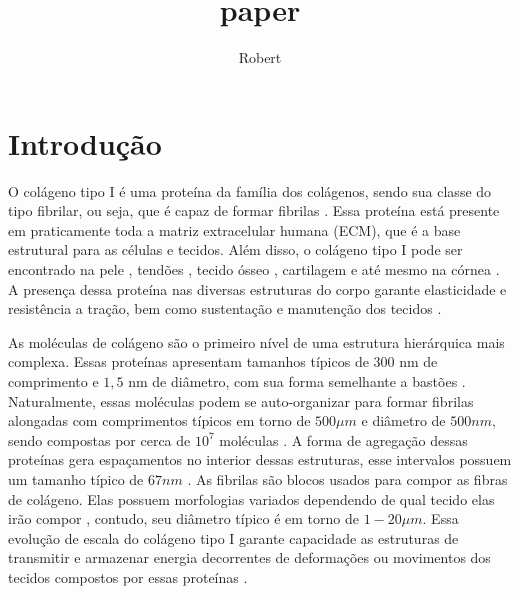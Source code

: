 \documentclass[11pt,a4paper]{article} %
\title{paper}
\author{Robert}
\begin{document}
\maketitle

\section{Introdução}

O colágeno tipo I é uma proteína da família dos colágenos, sendo sua classe do tipo fibrilar, ou seja, que é capaz de formar  
fibrilas \cite{Silver2018}. Essa proteína   está presente em praticamente toda a matriz extracelular humana (ECM), que é  
a base estrutural para as células e tecidos. Além disso, o colágeno tipo I pode ser encontrado na pele  
\cite{Davison-Kotler2019-do}, tendões \cite{Tresoldi2013-qq}, tecido ósseo \cite{FEDARKO201445, RicoLlanos2021}, cartilagem  
\cite{Sophia_Fox2009-qd} e até mesmo na córnea \cite{CHEN201569}. A presença dessa proteína nas diversas estruturas do corpo  
garante elasticidade e resistência a tração, bem como sustentação e manutenção dos tecidos \cite{Silver2018,Amirrah2022-uh}.   

 

As moléculas de colágeno são o primeiro nível de uma estrutura hierárquica mais complexa. Essas proteínas apresentam tamanhos 
típicos de $300$ nm de comprimento e $1,5$ nm de diâmetro, com sua forma semelhante a bastões \cite{Gelse2003,Silver2018}.  
Naturalmente, essas moléculas podem se auto-organizar para formar fibrilas alongadas com comprimentos típicos em torno de  
\(500 \mu m\) e diâmetro de \(500 nm\), sendo compostas por cerca de \(10^{7}\) moléculas \cite{Charvolin2019, KADLER1996,  
Parry1984}. A forma de agregação dessas proteínas gera espaçamentos no interior dessas estruturas, esse intervalos possuem  
um tamanho  típico de \(67 nm\) \cite{Zhu2018}. As fibrilas são blocos usados para compor as fibras de colágeno. Elas possuem  
morfologias variados dependendo de qual tecido elas irão compor \cite{Amirrah2022-uh}, contudo, seu diâmetro típico é em torno  
de \(1-20 \mu m\). Essa evolução de escala do colágeno tipo I garante capacidade as estruturas de transmitir e armazenar energia  
decorrentes de deformações ou movimentos dos tecidos compostos por essas proteínas \cite{Silver2008ViscoelasticityES}. 
\end{document}
